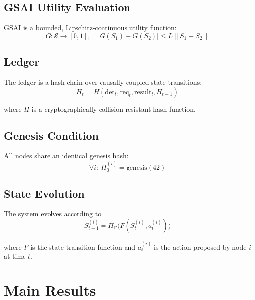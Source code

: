 \documentclass{article}
\begin{document}
\subsection{GSAI Utility Evaluation}

GSAI is a bounded, Lipschitz-continuous utility function:
\[
G: \mathcal{S} \to [0,1], \quad |G(S_1) - G(S_2)| \leq L \|S_1 - S_2\|
\]

\subsection{Ledger}

The ledger is a hash chain over causally coupled state transitions:
\[
H_t = H(\text{det}_t, \text{req}_t, \text{result}_t, H_{t-1})
\]

where $H$ is a cryptographically collision-resistant hash function.

\subsection{Genesis Condition}

All nodes share an identical genesis hash:
\[
\forall i:\; H_0^{(i)} = \text{genesis}(42)
\]

\subsection{State Evolution}

The system evolves according to:
\[
S_{t+1}^{(i)} = \Pi_{\mathcal{C}}\bigl(F(S_t^{(i)}, a_t^{(i)})\bigr)
\]

where $F$ is the state transition function and $a_t^{(i)}$ is the action
proposed by node $i$ at time $t$.

\section{Main Results}
\end{document}
